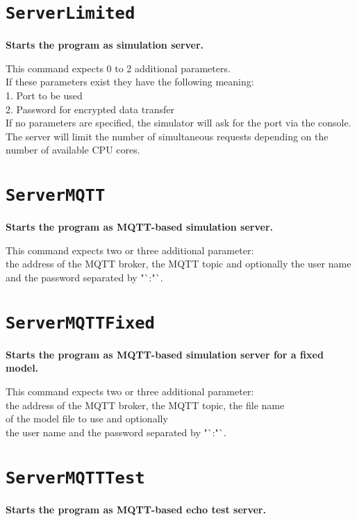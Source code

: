 \section{\texttt{ServerLimited}}

\textbf{Starts the program as simulation server.}

This command expects 0 to 2 additional parameters.\\
If these parameters exist they have the following meaning:\\
1. Port to be used\\
2. Password for encrypted data transfer\\
If no parameters are specified, the simulator will ask for the port via the console.\\
The server will limit the number of simultaneous requests depending on the\\
number of available CPU cores.

\section{\texttt{ServerMQTT}}

\textbf{Starts the program as MQTT-based simulation server.}

This command expects two or three additional parameter:\\
the address of the MQTT broker, the MQTT topic and optionally the user name and the password separated by "`:"`.

\section{\texttt{ServerMQTTFixed}}

\textbf{Starts the program as MQTT-based simulation server for a fixed model.}

This command expects two or three additional parameter:\\
the address of the MQTT broker, the MQTT topic, the file name\\
of the model file to use and optionally\\
the user name and the password separated by "`:"`.

\section{\texttt{ServerMQTTTest}}

\textbf{Starts the program as MQTT-based echo test server.}

